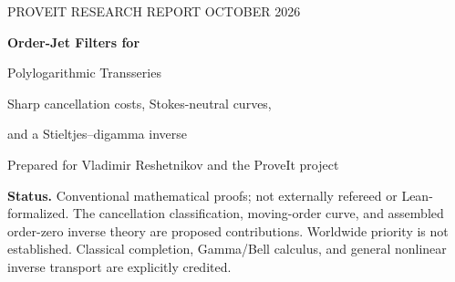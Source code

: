 \documentclass[11pt,a4paper]{article}
\numberwithin{equation}{section}
\theoremstyle{definition}\newtheorem{definition}[theorem]{Definition}
\theoremstyle{remark}\newtheorem{remark}[theorem]{Remark}
\newcommand{\ee}{\mathrm e}\newcommand{\ii}{\mathrm i}\newcommand{\dd}{\,\mathrm d}
\newcommand{\Li}{\operatorname{Li}}\newcommand{\PV}{\operatorname{PV}}
\begin{document}
\begin{center}
{\small PROVEIT RESEARCH REPORT \quad\textbar{} OCTOBER 2026}\par\vspace{8mm}
{\LARGE\bfseries Order-Jet Filters for\par Polylogarithmic Transseries}\par\vspace{5mm}
{\large Sharp cancellation costs, Stokes-neutral curves,\par
and a Stieltjes--digamma inverse}\par\vspace{7mm}
{Prepared for Vladimir Reshetnikov and the ProveIt project}
\end{center}
\vspace{4mm}
\begin{abstract}
We study finite differential operators in the order of
$F_s(x)=-\Li_s(-\ee^x)$, retaining both the Stokes jump and the
exponentially small correction to the arithmetic lateral average.
The classical completion formula turns an order polynomial $\Pi$ into
its values at $-\log n\pm\ii\pi$. This gives a sharp cancellation theorem:
the real polynomials cancelling both data at the first $N$ actions form
exactly the ideal generated by
$\prod_{n=1}^N((u+\log n)^2+\pi^2)$.
We also determine the separate optimal costs, including their change at
integer and half-integer orders, and use Gelfond--Schneider to prove a
nonvanishing rule for every pure integer-order jet.
For each $N\ge1$ a normalized degree-$N+1$ filter admits a unique
convergent moving-order curve on which the entire jump is zero. Its
detuning is explicitly asymptotic to a constant times $\ee^{-Nx}$,
although its physical completion still starts at $\ee^{-x}$.
At order zero, Jonqui\`ere's formula gives all jets in generalized
Stieltjes constants. A positive endpoint-subtracted integral shows that
$H(x)=\partial_sF_s(x)|_{s=0}$ is a real-analytic increasing bijection
$\R\to(0,\infty)$. Its digamma core has an exact ordinary Borel
representation. We prove convergent inverse charts at both endpoints
and compute a model-specific arithmetic-averaging defect:
the inverse-average error is asymptotic to $\pi^2w^2\ee^{-2w}$,
whereas the physical correction to the exact core inverse is only
$(\log2)w\ee^{-2w}$. Full proofs, finite exact regressions, and
independent high-precision integral checks are supplied.
\end{abstract}
\medskip
\noindent\textbf{Status.} Conventional mathematical proofs; not externally
refereed or Lean-formalized. The cancellation classification, moving-order
curve, and assembled order-zero inverse theory are proposed contributions.
Worldwide priority is not established. Classical completion, Gamma/Bell
calculus, and general nonlinear inverse transport are explicitly credited.
\newpage
\tableofcontents
\newpage
\end{document}
